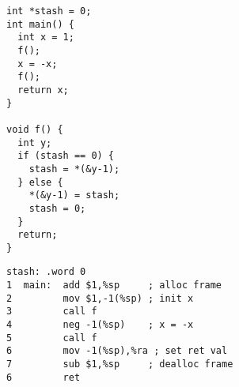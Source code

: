 \documentclass[10pt,conference]{ieeetran}%
\theoremstyle{definition}
\begin{document}
\begin{figure*}
  \centering
\hspace*{-6em}
  \begin{subfigure}[t]{.2\textwidth}
{\footnotesize
\begin{lstlisting}
int *stash = 0;
int main() {
  int x = 1;
  f();
  x = -x;
  f();
  return x;
}

void f() {
  int y;
  if (stash == 0) {
    stash = *(&y-1);
  } else {
    *(&y-1) = stash;
    stash = 0;
  }
  return;
}
\end{lstlisting}
}
\end{subfigure}
  \begin{subfigure}[t]{.4\textwidth}
{\footnotesize
\begin{lstlisting}[backgroundcolor=\color{lgray}]
   stash: .word 0
1  main:  add $1,%sp     ; alloc frame
2         mov $1,-1(%sp) ; init x
3         call f
4         neg -1(%sp)    ; x = -x
5         call f
6         mov -1(%sp),%ra ; set ret val
7         sub $1,%sp     ; dealloc frame
6         ret


\end{lstlisting}}
\end{subfigure}
\end{figure*}
\end{document}
